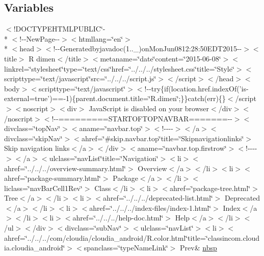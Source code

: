 \subsection*{Variables}
\begin{DoxyCompactItemize}
\item 
$<$!D\-O\-C\-T\-Y\-P\-E\-H\-T\-M\-L\-P\-U\-B\-L\-I\-C\char`\"{}-\/\\*
$<$!-\/-\/New\-Page-\/-\/$>$$<$htmllang=\char`\"{}en\char`\"{}$>$\\*
$<$head$>$$<$!-\/-\/Generatedbyjavadoc(1..\-\_)on\-Mon\-Jun0812\-:28\-:50\-E\-D\-T2015-\/-\/$>$$<$title$>$ R dimen$<$/title$>$$<$metaname=\char`\"{}date\char`\"{}content=\char`\"{}2015-\/06-\/08\char`\"{}$>$$<$linkrel=\char`\"{}stylesheet\char`\"{}type=\char`\"{}text/css\char`\"{}href=\char`\"{}../../../stylesheet.\-css\char`\"{}title=\char`\"{}\-Style\char`\"{}$>$$<$scripttype=\char`\"{}text/javascript\char`\"{}src=\char`\"{}../../../script.\-js\char`\"{}$>$$<$/script$>$$<$/head$>$$<$body$>$$<$scripttype=\char`\"{}text/javascript\char`\"{}$>$$<$!-\/-\/try\{if(location.\-href.\-index\-Of('is-\/external=true')==-\/1)\{parent.\-document.\-title=\char`\"{}\-R.\-dimen\char`\"{};\}\}catch(err)\{\}$<$/script$>$$<$noscript$>$$<$div$>$ Java\-Script is disabled on your browser$<$/div$>$$<$/noscript$>$$<$!-\/-\/=========\-S\-T\-A\-R\-T\-O\-F\-T\-O\-P\-N\-A\-V\-B\-A\-R=======-\/-\/$>$$<$divclass=\char`\"{}top\-Nav\char`\"{}$>$$<$aname=\char`\"{}navbar.\-top\char`\"{}$>$$<$!-\/-\/-\/-\/$>$$<$/a$>$$<$divclass=\char`\"{}skip\-Nav\char`\"{}$>$$<$ahref=\char`\"{}\#skip.\-navbar.\-top\char`\"{}title=\char`\"{}\-Skipnavigationlinks\char`\"{}$>$ Skip navigation links$<$/a$>$$<$/div$>$$<$aname=\char`\"{}navbar.\-top.\-firstrow\char`\"{}$>$$<$!-\/-\/-\/-\/$>$$<$/a$>$$<$ulclass=\char`\"{}nav\-List\char`\"{}title=\char`\"{}\-Navigation\char`\"{}$>$$<$li$>$$<$ahref=\char`\"{}../../../overview-\/summary.\-html\char`\"{}$>$ Overview$<$/a$>$$<$/li$>$$<$li$>$$<$ahref=\char`\"{}package-\/summary.\-html\char`\"{}$>$ Package$<$/a$>$$<$/li$>$$<$liclass=\char`\"{}nav\-Bar\-Cell1\-Rev\char`\"{}$>$ Class$<$/li$>$$<$li$>$$<$ahref=\char`\"{}package-\/tree.\-html\char`\"{}$>$ Tree$<$/a$>$$<$/li$>$$<$li$>$$<$ahref=\char`\"{}../../../deprecated-\/list.\-html\char`\"{}$>$ Deprecated$<$/a$>$$<$/li$>$$<$li$>$$<$ahref=\char`\"{}../../../index-\/files/index-\/1.\-html\char`\"{}$>$ Index$<$/a$>$$<$/li$>$$<$li$>$$<$ahref=\char`\"{}../../../help-\/doc.\-html\char`\"{}$>$ Help$<$/a$>$$<$/li$>$$<$/ul$>$$<$/div$>$$<$divclass=\char`\"{}sub\-Nav\char`\"{}$>$$<$ulclass=\char`\"{}nav\-List\char`\"{}$>$$<$li$>$$<$ahref=\char`\"{}../../../com/cloudia/cloudia\-\_\-android/\-R.\-color.\-html\char`\"{}title=\char`\"{}classincom.\-cloudia.\-cloudia\-\_\-android\char`\"{}$>$$<$spanclass=\char`\"{}type\-Name\-Link\char`\"{}$>$ Prev\& \hyperlink{_r_8dimen_8html_aef915316f784c9063d942974538301a6}{nbsp}

\end{DoxyCompactItemize}

